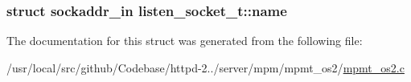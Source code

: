 \subsubsection[{\texorpdfstring{name}{name}}]{\setlength{\rightskip}{0pt plus 5cm}struct sockaddr\+\_\+in listen\+\_\+socket\+\_\+t\+::name}\hypertarget{structlisten__socket__t_a56aee878da44645daeb92d49f9af2601}{}\label{structlisten__socket__t_a56aee878da44645daeb92d49f9af2601}


The documentation for this struct was generated from the following file\+:\begin{DoxyCompactItemize}
\item 
/usr/local/src/github/\+Codebase/httpd-\/2../server/mpm/mpmt\+\_\+os2/\hyperlink{mpmt__os2_8c}{mpmt\+\_\+os2.\+c}\end{DoxyCompactItemize}
